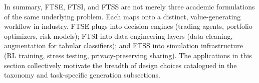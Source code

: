 In summary, FTSE, FTSI, and FTSS are not merely three academic
formulations of the same underlying problem. Each maps onto a
distinct, value-generating workflow in industry. FTSE plugs into
decision engines (trading agents, portfolio optimizers, risk models);
FTSI into data-engineering layers (data cleaning, augmentation for
tabular classifiers); and FTSS into simulation infrastructure (RL
training, stress testing, privacy-preserving sharing). The applications
in this section collectively motivate the breadth of design choices
catalogued in the taxonomy and task-specific generation subsections.

